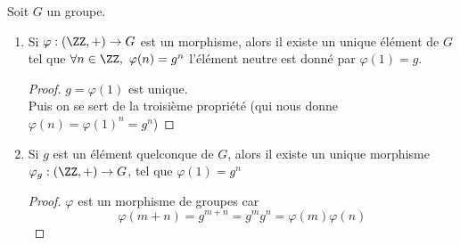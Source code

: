 \documentclass[../main.tex]{subfile}
\begin{document}
\begin{prop}
	Soit $G$ un groupe.\\
\begin{enumerate}	
	\item Si $\varphi : (\ZZ, +) \to G$ est un morphisme, alors il existe un unique élément de $G$ tel que $\forall n \in \ZZ, \ \varphi(n) = g^n$
	l'élément neutre est donné par $\varphi(1) = g$.
\begin{proof}	
	$g=\varphi(1)$ est unique.\\
	Puis on se sert de la troisième propriété (qui nous donne $\varphi(n) = \varphi(1)^n = g^n$)
\end{proof}

	\item Si $g$ est un élément quelconque de $G$, alors il existe un unique morphisme $\varphi_g : (\ZZ, +) \to G$, tel que $\varphi(1) = g^n$
\begin{proof}	
	$\varphi$ est un morphisme de groupes car
	$$\varphi(m+n) = g^{m+n} = g^mg^n = \varphi(m)\varphi(n)$$
\end{proof}
\end{enumerate}
\end{prop}
\end{document}
